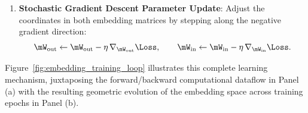 \documentclass[../../main.tex]{subfiles}
\begin{document}
\begin{enumerate}
\begin{equation}
    \nabla_{\mW_{\text{out}}} \Loss = \vh \, \boldsymbol{\delta}^\top \in \R^{d \times V}, \quad \nabla_\vh \Loss = \mW_{\text{out}} \boldsymbol{\delta} \in \R^d, \quad \nabla_{\mW_{\text{in}}} \Loss = (\nabla_\vh \Loss) \, \ve_{\text{context}}^\top \in \R^{d \times V}.
    \end{equation}
    \item \textbf{Stochastic Gradient Descent Parameter Update}: Adjust the coordinates in both embedding matrices by stepping along the negative gradient direction:
    \begin{equation}
    \label{eq:sgd_updates}
    \mW_{\text{out}} \leftarrow \mW_{\text{out}} - \eta \, \nabla_{\mW_{\text{out}}} \Loss, \qquad \mW_{\text{in}} \leftarrow \mW_{\text{in}} - \eta \, \nabla_{\mW_{\text{in}}} \Loss.
    \end{equation}
\end{enumerate}

Figure~\ref{fig:embedding_training_loop} illustrates this complete learning mechanism, juxtaposing the forward/backward computational dataflow in Panel (a) with the resulting geometric evolution of the embedding space across training epochs in Panel (b).
\end{document}
